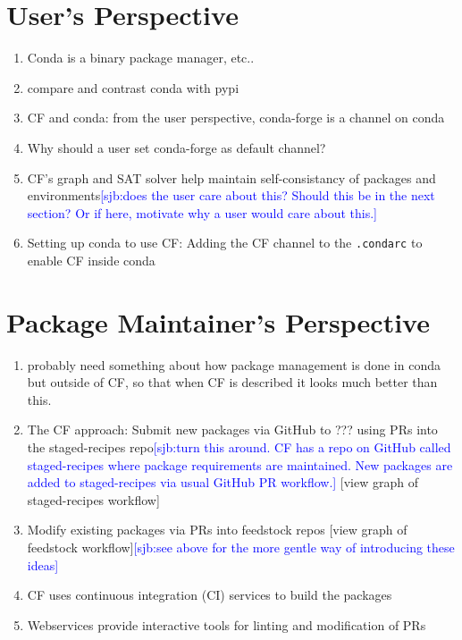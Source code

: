 \documentclass[fleqn,10pt,lineno]{wlpeerj} %
\newcommand{\sjb}[1]{\textcolor{blue}{[sjb:#1]}}
\newcounter{saveenumi}
\newcommand{\seti}{\setcounter{saveenumi}{\value{enumi}}}
\newcommand{\conti}{\setcounter{enumi}{\value{saveenumi}}}
\begin{document}
\section*{User's Perspective}
\begin{enumerate}\conti
\item Conda is a binary package manager, etc..
\item compare and contrast conda with pypi
\item CF and conda:  from the user perspective, conda-forge is a channel on conda
\item Why should a user set conda-forge as default channel?
\item CF's graph and SAT solver help maintain self-consistancy of
packages and environments\sjb{does the user care about this?  Should this be in the next section?  Or if here, motivate why a user would care about this.}
\item Setting up conda to use CF: Adding the CF channel to the \texttt{.condarc} to enable CF
inside conda
\end{enumerate}\seti

\section*{Package Maintainer's Perspective}
\begin{enumerate}\conti
\item probably need something about how package management is done in conda but outside of CF, so that when CF is described it looks much better than this.
\item The CF approach: Submit new packages via GitHub to ??? using PRs into the staged-recipes repo\sjb{turn this around.  CF has a repo on GitHub called staged-recipes where package requirements are maintained.  New packages are added to staged-recipes via usual GitHub PR workflow.}
[view graph of staged-recipes workflow]
\item Modify existing packages via PRs into feedstock repos [view graph of
feedstock workflow]\sjb{see above for the more gentle way of introducing these ideas}
\item CF uses continuous integration (CI) services to build the packages
\item Webservices provide interactive tools for linting and modification of PRs
\end{enumerate}\seti
\end{document}
